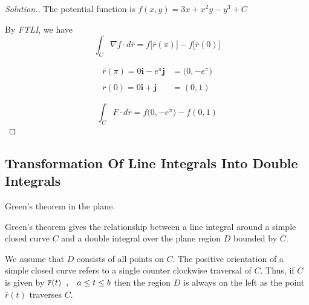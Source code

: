 \documentclass[11pt,a4paper]{article}
\theoremstyle{definition}
\newenvironment{solution}
  {\renewcommand{\qedsymbol}{}\begin{proof}[\textit{Solution}.]}
  {\end{proof}}
\begin{document}
\begin{solution}


The potential function is $f(x,y) = 3x + x^2y - y^3 +C$


By \textit{FTLI}, we have
$$\int_C \nabla f \cdot d\overline{r} = f\big[\overline{r}(\pi)\big] - f\big[\overline{r}(0)\big]$$

\begin{align*}
\overline{r}(\pi) = 0\textbf{i} - e^{\pi}\textbf{j} & = \big( 0, -e^{\pi}\big)\\\\
\overline{r}(0) = 0\textbf{i} + \textbf{j} & = (0,1)
\end{align*}

$$\int_C F\cdot d\overline{r} = f\big(0, -e^{\pi}\big) - f(0,1)$$


\pagebreak
\end{solution}
{\color[wave]{485}\subsection{Transformation Of Line Integrals Into Double Integrals}}
Green's theorem in the plane.


Green's theorem gives the relationship between a line integral around a simple closed curve $C$ and a double integral over the plane region $D$ bounded by $C$.


We assume that $D$ consists of all points on $C$. The positive orientation of a simple closed curve refers to a single counter clockwise traversal of $C$. Thus, if $C$ is given by $\overline{r}(t)\hspace{0.2cm}, \hspace{0.3cm} a\leq t \leq b$ then the region $D$ is always on the left as the point $\overline{r}(t)$ traverses $C$.

\end{document}
